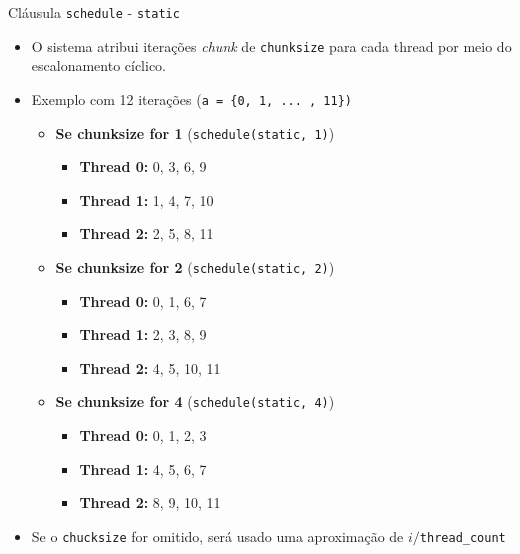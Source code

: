 	
	\begin{frame}{Cláusula {\tt schedule} - {\tt static}}
		\begin{itemize}
			\item O sistema atribui iterações \textit{chunk} de {\tt chunksize} para cada thread por meio do escalonamento cíclico.
					\bigskip
			\item Exemplo com 12 iterações ({\tt a = \{0, 1, ... , 11\})}
					\pause
			\begin{itemize}
				\setlength\itemsep{0.5em}
				\item \textbf{Se chunksize for 1} ({\tt schedule(static, 1)})
				\begin{itemize}
					\setlength\itemsep{0.3em}
					\item \textbf{Thread 0:} 0, 3, 6, 9
					\item \textbf{Thread 1:} 1, 4, 7, 10
					\item \textbf{Thread 2:} 2, 5, 8, 11
				\end{itemize}
						\pause
				\item \textbf{Se chunksize for 2} ({\tt schedule(static, 2)})
				\begin{itemize}
					\setlength\itemsep{0.3em}
					\item \textbf{Thread 0:} 0, 1, 6, 7
					\item \textbf{Thread 1:} 2, 3, 8, 9
					\item \textbf{Thread 2:} 4, 5, 10, 11
				\end{itemize}
						\pause 
				\item \textbf{Se chunksize for 4} ({\tt schedule(static, 4)})
				\begin{itemize}
					\setlength\itemsep{0.3em}
					\item \textbf{Thread 0:} 0, 1, 2, 3
					\item \textbf{Thread 1:} 4, 5, 6, 7
					\item \textbf{Thread 2:} 8, 9, 10, 11
				\end{itemize}
			\end{itemize}
			\item Se o {\tt chucksize} for omitido, será usado uma aproximação de $i/${\tt thread\_count}
		\end{itemize}
	\end{frame}

